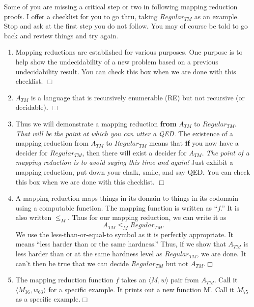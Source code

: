 \documentclass[10pt]{article}
\begin{document}
\noindent Some of you are missing a critical step or two in following
mapping reduction proofs.
%
I offer a checklist for you to go thru, taking $Regular_{TM}$ as an example.
%
Stop and ask at the first step you do not follow.
%
You may of course be told to go back and review things and try again.

\begin{enumerate}

\item Mapping reductions are established for various purposes. One purpose
  is to help show the undecidability of a new problem based on a previous undecidability
  result. You can check this box when we are done with this checklist. \hfill$\Box$

\item $A_{TM}$ is a language that is recursively enumerable (RE) but not recursive (or decidable). \hfill$\Box$

\item Thus we will demonstrate a mapping reduction {\bf from}
  $A_{TM}$ to $Regular_{TM}$. {\sl That will be the point at which you can utter a QED.}
  The existence of a mapping reduction from
  $A_{TM}$ to $Regular_{TM}$ means that {\bf if} you now have a decider for
  $Regular_{TM}$, then there will exist a decider for
  $A_{TM}$.
  {\sl The point of a mapping reduction is to avoid saying this time and again!}
  Just exhibit a mapping reduction, put down your chalk, smile, and say QED.
  You can check this box when we are done with this checklist. \hfill$\Box$

\item A mapping reduction maps things in its domain to things in its
  codomain using a computable function. The mapping function is
  written as ``$f$.'' It is also written $\leq_{M}$. Thus for our
  mapping reduction, we can write it as 
  \[ A_{TM} \leq_M Regular_{TM}. \] 
  We use the less-than-or-equal-to symbol as it is perfectly appropriate.
  It means ``less harder than or the same hardness.''  
  Thus, if we show that $A_{TM}$ is less harder than or at the
  same hardness level as $Regular_{TM}$, we are done. It can't then
  be true that we can decide $Regular_{TM}$ but not $A_{TM}$.\hfill$\Box$

\item The mapping reduction function $f$ takes an
  $\langle M,w\rangle$ pair from $A_{TM}$.
  Call it $\langle M_{36},w_{63}\rangle$ for a specific example.
  It prints out a new function M'.
  Call it $M_{75}$ as a specific example.\hfill$\Box$


\end{enumerate}
\end{document}
